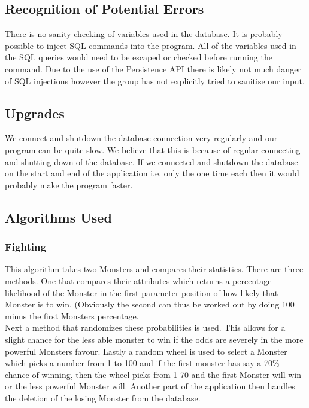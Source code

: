 \documentclass[titlepage]{article}
\begin{document}
{\subsection {Recognition of Potential Errors}
There is no sanity checking of variables used in the database. It is probably possible to inject SQL commands into the program. All of the variables used in the SQL queries would need to be escaped or checked before running the command. Due to the use of the Persistence API there is likely not much danger of SQL injections however the group has not explicitly tried to sanitise our input.
\subsection {Upgrades}
We connect and shutdown the database connection very regularly and our program can be quite slow. We believe that this is because of regular connecting and shutting down of the database. If we connected and shutdown the database on the start and end of the application i.e. only the one time each then it would probably make the program faster.
\subsection {Algorithms Used}
\subsubsection{Fighting}
This algorithm takes two Monsters and compares their statistics. There are three methods. One that compares their attributes which returns a percentage likelihood of the Monster in the first parameter position of how likely that Monster is to win. (Obviously the second can thus be worked out by doing 100 minus the first Monsters percentage.
\\
Next a method that randomizes these probabilities is used. This allows for a slight chance for the less able monster to win if the odds are severely in the more powerful Monsters favour. Lastly a random wheel is used to select a Monster which picks a number from 1 to 100 and if the first monster has say a 70\% chance of winning, then the wheel picks from 1-70 and the first Monster will win or the less powerful Monster will. Another part of the application then handles the deletion of the losing Monster from the database.
}
\end{document}
